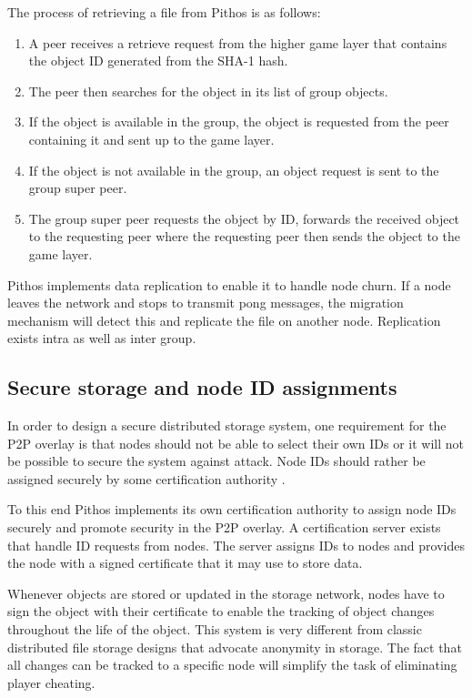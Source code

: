 \documentclass[10pt,a4paper,conference]{IEEEtran}
\begin{document}
The process of retrieving a file from Pithos is as follows:
\begin{enumerate}
\item A peer receives a retrieve request from the higher game layer that contains the object ID generated from the SHA-1 hash.
\item The peer then searches for the object in its list of group objects.
\item If the object is available in the group, the object is requested from the peer containing it and sent up to the game layer.
\item If the object is not available in the group, an object request is sent to the group super peer.
\item The group super peer requests the object by ID, forwards the received object to the requesting peer where the requesting peer then sends
    the object to the game layer.
\end{enumerate}

Pithos implements data replication to enable it to handle node churn. If a node leaves the network and stops to transmit pong messages, the migration
mechanism will detect this and replicate the file on another node. Replication exists intra as well as inter group.

\subsection{Secure storage and node ID assignments}
\label{secure_ids}

In order to design a secure distributed storage system, one requirement for the P2P overlay is that nodes should not be able to select their own IDs
or it will not be possible to secure the system against attack. Node IDs should rather be assigned securely by some certification authority
\cite{secure_overlay_routing}.

To this end Pithos implements its own certification authority to assign node IDs securely and promote security in the P2P overlay. A certification
server exists that handle ID requests from nodes. The server assigns IDs to nodes and provides the node with a signed certificate that it may use to
store data.

Whenever objects are stored or updated in the storage network, nodes have to sign the object with their certificate to enable the tracking of object
changes throughout the life of the object. This system is very different from classic distributed file storage designs that advocate anonymity in
storage. The fact that all changes can be tracked to a specific node will simplify the task of eliminating player cheating.
\end{document}
